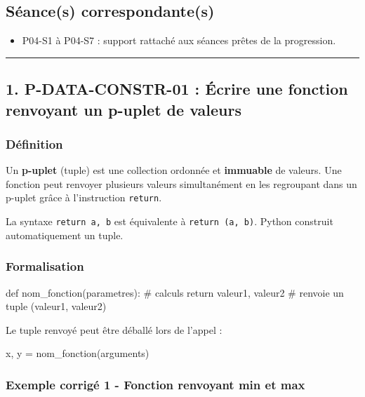 \subsection{Séance(s) correspondante(s)}

\begin{itemize}
\tightlist
\item
  P04-S1 à P04-S7 : support rattaché aux séances prêtes de la
  progression.
\end{itemize}

\begin{center}\rule{0.5\linewidth}{0.5pt}\end{center}

\subsection{1. P-DATA-CONSTR-01 : Écrire une fonction renvoyant un p-uplet de valeurs}

\subsubsection{Définition}

Un \textbf{p-uplet} (tuple) est une collection ordonnée et
\textbf{immuable} de valeurs. Une fonction peut renvoyer plusieurs
valeurs simultanément en les regroupant dans un p-uplet grâce à
l'instruction \texttt{return}.

La syntaxe \texttt{return\ a,\ b} est équivalente à
\texttt{return\ (a,\ b)}. Python construit automatiquement un tuple.

\subsubsection{Formalisation}

\begin{python}
def nom_fonction(parametres):
    # calculs
    return valeur1, valeur2  # renvoie un tuple (valeur1, valeur2)
\end{python}

Le tuple renvoyé peut être déballé lors de l'appel :

\begin{python}
x, y = nom_fonction(arguments)
\end{python}

\subsubsection{Exemple corrigé 1 - Fonction renvoyant min et max}

